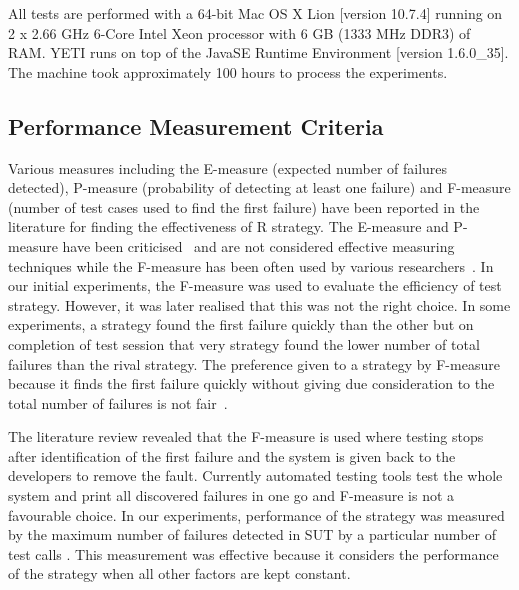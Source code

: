 All tests are performed with a 64-bit Mac OS X Lion [version 10.7.4] running on 2 x 2.66 GHz 6-Core Intel Xeon processor with 6 GB (1333 MHz DDR3) of RAM. YETI runs on top of the Java\texttrademark  SE Runtime Environment [version 1.6.0\_35]. The machine took approximately 100 hours to process the experiments.


\subsection{Performance Measurement Criteria} \label{measurementCriteria_4}
Various measures including the E-measure (expected number of failures detected), P-measure (probability of detecting at least one failure) and F-measure (number of test cases used to find the first failure) have been reported in the literature for finding the effectiveness of R strategy. The E-measure and P-measure have been criticised~\cite{chen2005adaptive} and are not considered effective measuring techniques while the F-measure has been often used by various researchers~\cite{chen2004statistical, chen1996expected}. In our initial experiments, the F-measure was used to evaluate the efficiency of test strategy. However, it was later realised that this was not the right choice. In some experiments, a strategy found the first failure quickly than the other but on completion of test session that very strategy found the lower number of total failures than the rival strategy. The preference given to a strategy by F-measure because it finds the first failure quickly without giving due consideration to the total number of failures is not fair~\cite{liu2012comparison}.


  
The literature review revealed that the F-measure is used where testing stops after identification of the first failure and the system is given back to the developers to remove the fault. Currently automated testing tools test the whole system and print all discovered failures in one go and F-measure is not a favourable choice. In our experiments, performance of the strategy was measured by the maximum number of failures detected in SUT by a particular number of test calls \cite{ciupa2007experimental, pacheco2007feedback, ciupa2008predictability}. This measurement was effective because it considers the performance of the strategy when all other factors are kept constant.



